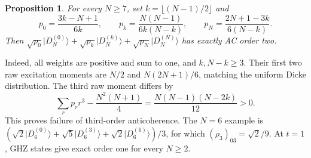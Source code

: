 \documentclass[11pt]{article}
\newtheorem{proposition}{Proposition}
\newcommand{\D}[2]{\lvert D_{#1}^{(#2)}\rangle}
\begin{document}
\begin{proposition}
For every $N\ge7$, set $k=\lfloor(N-1)/2\rfloor$ and
\[
p_0=\frac{3k-N+1}{6k},\qquad
p_k=\frac{N(N-1)}{6k(N-k)},\qquad
p_N=\frac{2N+1-3k}{6(N-k)}.
\]
Then $\sqrt{p_0}\D{N}{0}+\sqrt{p_k}\D{N}{k}+\sqrt{p_N}\D{N}{N}$ has exactly AC order two.
\end{proposition}
Indeed, all weights are positive and sum to one, and $k,N-k\ge3$. Their first two raw excitation moments are $N/2$ and $N(2N+1)/6$, matching the uniform Dicke distribution. The third raw moment differs by
\[
\sum_rp_rr^3-\frac{N^2(N+1)}4=\frac{N(N-1)(N-2k)}{12}>0.
\]
This proves failure of third-order anticoherence. The $N=6$ example is $(\sqrt2\D6{0}+\sqrt5\D6{3}+\sqrt2\D6{6})/3$, for which $(\rho_3)_{03}=\sqrt2/9$. At $t=1$, GHZ states give exact order one for every $N\ge2$.
\end{document}
